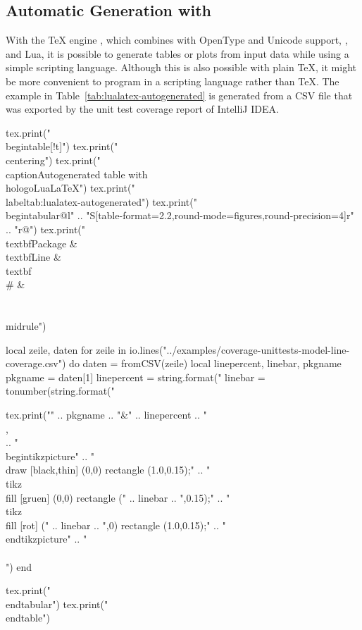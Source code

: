 \subsection{Automatic Generation with }

With the \TeX{} engine , which combines  with
OpenType and Unicode support, , and Lua, it is possible to
generate tables or plots from input data while using a simple scripting
language.  Although this is also possible with plain \TeX{}, it might be more
convenient to program in a scripting language rather than \TeX{}.  The example
in Table~\ref{tab:lualatex-autogenerated} is generated from a CSV file that was
exported by the unit test coverage report of IntelliJ IDEA.

\begin{luacode}
tex.print("\\begin{table}[!t]")
tex.print("\\centering")
tex.print("\\caption{Autogenerated table with \\hologo{LuaLaTeX}}")
tex.print("\\label{tab:lualatex-autogenerated}")
tex.print("\\begin{tabular}{@{}l"
  .. "S[table-format=2.2,round-mode=figures,round-precision=4]r"
  .. "r@{}}")
tex.print("\\textbf{Package} & \\textbf{Line} & \\textbf{\\#} & \\\\\\midrule")

local zeile, daten
for zeile in io.lines("../examples/coverage-unittests-model-line-coverage.csv") do
  daten = fromCSV(zeile)
  local linepercent, linebar, pkgname
  pkgname = daten[1]
  linepercent = string.format("%
  linebar = tonumber(string.format("%

  tex.print("" .. pkgname .. "&"
    .. linepercent .. "\\,\\%
    .. "\\begin{tikzpicture}"
    .. "\\draw [black,thin] (0,0) rectangle (1.0,0.15);"
    .. "\\tikz \\fill [gruen] (0,0) rectangle (" .. linebar .. ",0.15);"
    .. "\\tikz \\fill [rot] (" .. linebar .. ",0) rectangle (1.0,0.15);"
    .. "\\end{tikzpicture}"
    .. "\\\\")
end

tex.print("\\end{tabular}")
tex.print("\\end{table}")
\end{luacode}

